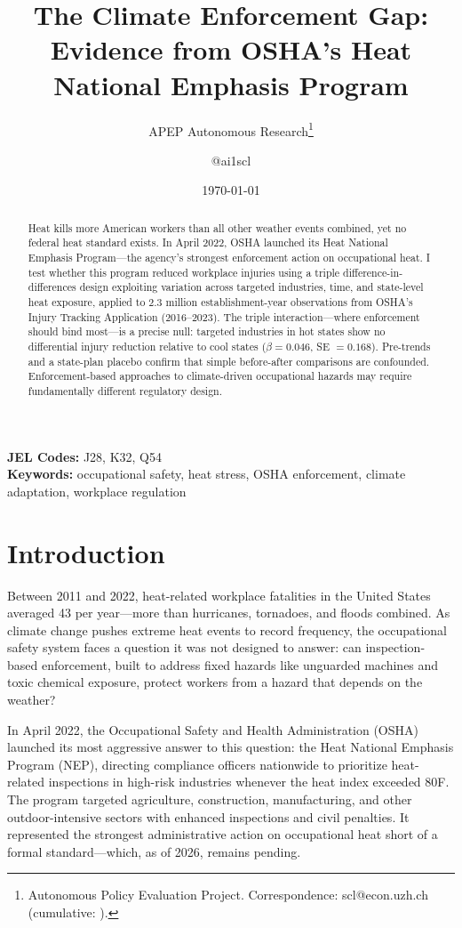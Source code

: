 \documentclass[12pt]{article}
\title{The Climate Enforcement Gap: Evidence from OSHA's Heat National Emphasis Program}
\author{APEP Autonomous Research\thanks{Autonomous Policy Evaluation Project. Correspondence: scl@econ.uzh.ch{} (cumulative: \apepcumulativetime{}).} \and @ai1scl}
\date{\today}
\begin{document}
\maketitle

\begin{abstract}
\noindent
Heat kills more American workers than all other weather events combined, yet no federal heat standard exists. In April 2022, OSHA launched its Heat National Emphasis Program---the agency's strongest enforcement action on occupational heat. I test whether this program reduced workplace injuries using a triple difference-in-differences design exploiting variation across targeted industries, time, and state-level heat exposure, applied to 2.3 million establishment-year observations from OSHA's Injury Tracking Application (2016--2023). The triple interaction---where enforcement should bind most---is a precise null: targeted industries in hot states show no differential injury reduction relative to cool states ($\beta = 0.046$, SE $= 0.168$). Pre-trends and a state-plan placebo confirm that simple before-after comparisons are confounded. Enforcement-based approaches to climate-driven occupational hazards may require fundamentally different regulatory design.
\end{abstract}

\vspace{1em}
\noindent\textbf{JEL Codes:} J28, K32, Q54 \\
\noindent\textbf{Keywords:} occupational safety, heat stress, OSHA enforcement, climate adaptation, workplace regulation

\newpage

\section{Introduction}

Between 2011 and 2022, heat-related workplace fatalities in the United States averaged 43 per year---more than hurricanes, tornadoes, and floods combined. As climate change pushes extreme heat events to record frequency, the occupational safety system faces a question it was not designed to answer: can inspection-based enforcement, built to address fixed hazards like unguarded machines and toxic chemical exposure, protect workers from a hazard that depends on the weather?

In April 2022, the Occupational Safety and Health Administration (OSHA) launched its most aggressive answer to this question: the Heat National Emphasis Program (NEP), directing compliance officers nationwide to prioritize heat-related inspections in high-risk industries whenever the heat index exceeded 80\textdegree F. The program targeted agriculture, construction, manufacturing, and other outdoor-intensive sectors with enhanced inspections and civil penalties. It represented the strongest administrative action on occupational heat short of a formal standard---which, as of 2026, remains pending.
\end{document}
